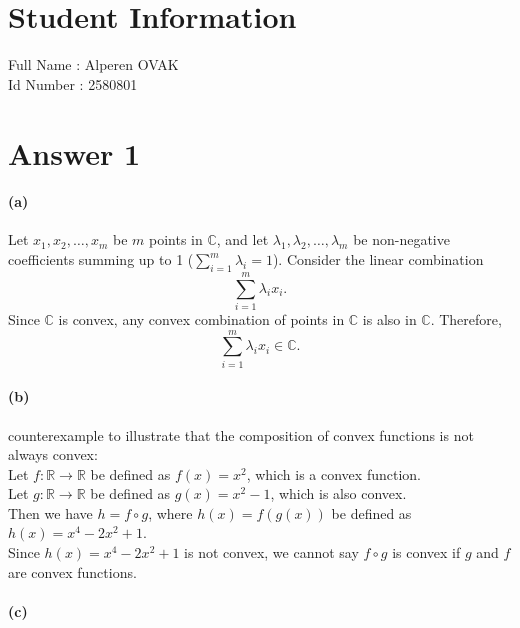 \documentclass[12pt]{article}
\begin{document}
\section*{Student Information } 
Full Name :  Alperen OVAK\\
Id Number :  2580801\\

\section*{Answer 1}

\paragraph{(a)}
Let \(x_1, x_2, \ldots, x_m\) be \(m\) points in \(\mathbb{C}\), and let \(\lambda_1, \lambda_2, \ldots, \lambda_m\) be non-negative coefficients summing up to 1 (\(\sum_{i=1}^{m} \lambda_i = 1\)). Consider the linear combination
\[
\sum_{i=1}^{m} \lambda_i x_i.
\]
Since \(\mathbb{C}\) is convex, any convex combination of points in \(\mathbb{C}\) is also in \(\mathbb{C}\). Therefore,
\[
\sum_{i=1}^{m} \lambda_i x_i \in \mathbb{C}.
\]

\paragraph{(b)}
counterexample to illustrate that the composition of convex functions is not always convex: \\

Let \( f: \mathbb{R} \rightarrow \mathbb{R} \) be defined as \( f(x) = x^2 \), which is a convex function. \\

Let \( g: \mathbb{R} \rightarrow \mathbb{R} \) be defined as \( g(x) = x^2-1 \), which is also convex. \\

Then we have \( h = f \circ g \), where \( h(x) = f(g(x)) \) be defined as \( h(x) = x^4-2x^2+1 \). \\

Since \( h(x) = x^4-2x^2+1 \) is not convex, we cannot say \( f \circ g \) is convex if \( g \) and \( f \) are convex functions.
\paragraph{(c)}
\end{document}
